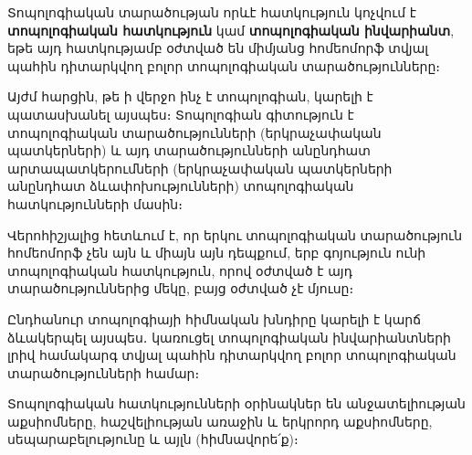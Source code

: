 \documentclass[./main.tex]{subfiles}
\begin{document}
\begin{definition} 
Տոպոլոգիական տարածության որևէ հատկություն կոչվում է \textbf{տո\-պո\-լո\-գիական հատկություն} կամ \textbf{տոպոլոգիական ինվարիանտ}, եթե այդ հատ\-կութ\-յամբ օժտված են միմյանց հոմեոմորֆ տվյալ պահին դիտարկվող բոլոր տո\-պո\-լո\-գիական տարածությունները։
\end{definition}


\par Այժմ հարցին, թե ի վերջո ինչ է տոպոլոգիան, կարելի է պատասխանել այսպես։ Տոպոլոգիան գիտություն է տոպոլոգիական տարածությունների (երկրաչափական պատ\-կերների) և այդ տարածությունների անընդհատ արտապատկերումների (երկ\-րա\-չափական պատկերների անընդհատ ձևափոխությունների) տոպոլոգիական \linebreak հատ\-կությունների մասին։ 

\par Վերոհիշյալից հետևում է, որ երկու տոպոլոգիական տարածություն հոմեոմորֆ չեն այն և միայն այն դեպքում, երբ գոյություն ունի տոպոլոգիական հատկություն, որով օժտված է այդ տարածություններից մեկը, բայց օժտված չէ մյուսը։
\par Ընդհանուր տոպոլոգիայի հիմնական խնդիրը կարելի է կարճ ձևակերպել այս\-պես․ կառուցել տոպոլոգիական ինվարիանտների լրիվ համակարգ տվյալ պահին դի\-տարկ\-վող բոլոր տոպոլոգիական տարածությունների համար։
\par Տոպոլոգիական հատկությունների օրինակներ են անջատելիության աքսիոմնե\-րը, հաշվելիության առաջին և երկրորդ աքսիոմները, սեպարաբելությունը և այլն (հիմնավորե՛ք)։
\end{document}
